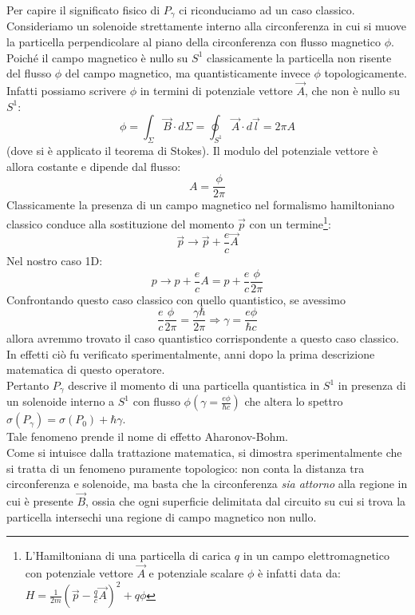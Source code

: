 \documentclass[../../FisicaTeorica.tex]{subfiles}
\begin{document}
Per capire il significato fisico di $P_\gamma$ ci riconduciamo ad un caso classico. Consideriamo un solenoide strettamente interno alla circonferenza in cui si muove la particella perpendicolare al piano della circonferenza con flusso magnetico $\phi$.\\
Poiché il campo magnetico è nullo su $S^1$ classicamente la particella non risente del flusso $\phi$  del campo magnetico, ma quantisticamente invece  $\phi$  topologicamente. Infatti possiamo scrivere $\phi$ in termini di potenziale vettore $\vec{A}$, che non è nullo su $S^1$:
\[
\phi =\int_{\Sigma}{\vec{B}\cdot d\Sigma=\oint_{S^1}{\vec{A}\cdot d\vec{l}}}=2\pi A
\]
(dove si è applicato il teorema di Stokes). Il modulo del potenziale vettore è allora costante e dipende dal flusso:
\[
A=\frac{\phi}{2\pi}
\]
Classicamente la presenza di un campo magnetico nel formalismo hamiltoniano classico conduce alla sostituzione del momento $\vec{p}$ con un termine\footnote{L'Hamiltoniana di una particella di carica $q$ in un campo elettromagnetico con potenziale vettore $\vec{A}$ e potenziale scalare $\phi$ è infatti data da: $H = \frac{1}{2m}\left(\vec{p}-\frac{q}{c}\vec{A}\right )^2 +q\phi$}:
\[
\vec{p}\rightarrow \vec{p}+\frac{e}{c} \vec{A}
\]
Nel nostro caso 1D:
\[
p\rightarrow p+\frac{e}{c}A=p+\frac{e}{c}\frac{\phi}{2\pi}
\]%
Confrontando questo caso classico con quello quantistico, se avessimo
\[
\frac{e}{c}\frac{\phi}{2\pi} = \frac{\gamma\hbar}{2\pi} \Rightarrow 
\gamma =\frac{e\phi}{\hbar c} 
\]
allora avremmo trovato il caso quantistico corrispondente a questo caso classico. In effetti ciò fu verificato sperimentalmente, anni dopo la prima descrizione matematica di questo operatore.\\
Pertanto $P_\gamma$ descrive il momento di una particella quantistica in $S^1$ in presenza di un solenoide interno a $S^1$ con flusso $\phi (\gamma =\frac{e\phi}{\hbar c})$ che altera lo spettro $\sigma \left(P_\gamma\right)=\sigma\left(P_0\right)+\hbar \gamma$.\\
Tale fenomeno prende il nome di effetto Aharonov-Bohm.\\ Come si intuisce dalla trattazione matematica, si dimostra sperimentalmente che si tratta di un fenomeno puramente topologico: non conta la distanza tra circonferenza e solenoide, ma basta che la circonferenza \textit{sia attorno} alla regione in cui è presente $\vec{B}$, ossia che ogni superficie delimitata dal circuito su cui si trova la particella intersechi una regione di campo magnetico non nullo.
\end{document}
